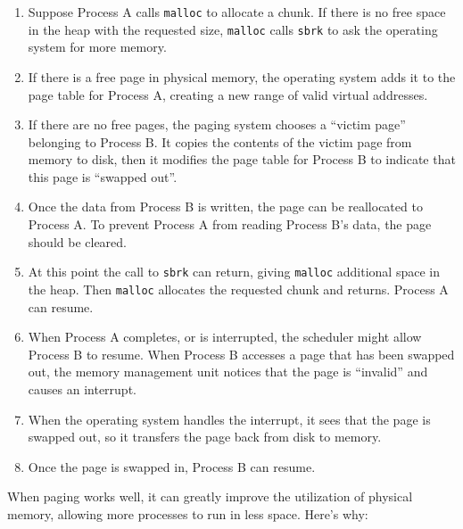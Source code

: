 \documentclass[12pt]{book}
\begin{document}
\begin{enumerate}

\item Suppose Process A calls {\tt malloc} to allocate a chunk.  If there
is no free space in the heap with the requested size, {\tt malloc} calls
{\tt sbrk} to ask the operating system for more memory.

\item If there is a free page in physical memory, the operating system
adds it to the page table for Process A, creating a new range of valid
virtual addresses.

\item If there are no free pages, the paging system chooses a ``victim
page'' belonging to Process B.  It copies the contents of the victim
page from memory to disk, then it modifies the page table for Process
B to indicate that this page is ``swapped out''.

\item Once the data from Process B is written, the page can be reallocated
to Process A.  To prevent Process A from reading Process B's data, the
page should be cleared.

\item At this point the call to {\tt sbrk} can return, giving {\tt malloc}
additional space in the heap.  Then {\tt malloc} allocates the requested
chunk and returns.  Process A can resume.

\item When Process A completes, or is interrupted, the scheduler might
allow Process B to resume.  When Process B accesses a page that has been swapped out, the memory management unit notices that the page is ``invalid'' and causes an interrupt.

\item When the operating system handles the interrupt, it sees that
the page is swapped out, so it transfers the page back from disk to
memory.  

\item Once the page is swapped in, Process B can resume.

\end{enumerate}

When paging works well, it can greatly improve the utilization of
physical memory, allowing more processes to run in less space.
Here's why:
\end{document}

